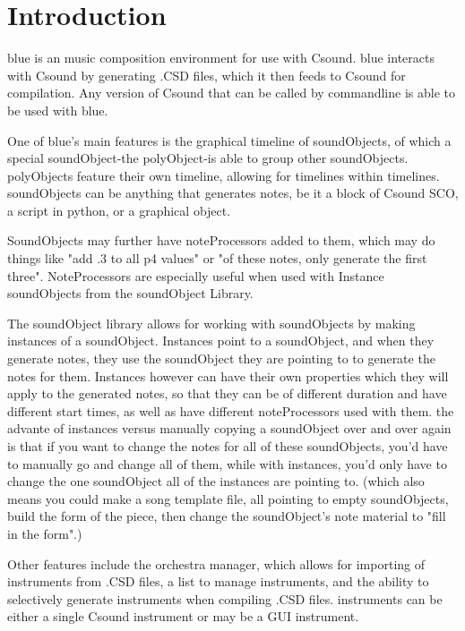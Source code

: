 \section{Introduction}\label{userIntro}

blue is an music composition environment for use with Csound. blue
interacts with Csound by generating .CSD files, which it then feeds to
Csound for compilation. Any version of Csound that can be called by
commandline is able to be used with blue.

One of blue's main features is the graphical timeline of soundObjects,
of which a special soundObject-the polyObject-is able to group other
soundObjects. polyObjects feature their own timeline, allowing for
timelines within timelines. soundObjects can be anything that generates
notes, be it a block of Csound SCO, a script in python, or a graphical
object.

SoundObjects may further have noteProcessors added to them, which may do
things like "add .3 to all p4 values" or "of these notes, only generate
the first three". NoteProcessors are especially useful when used with
Instance soundObjects from the soundObject Library.

The soundObject library allows for working with soundObjects by making
instances of a soundObject. Instances point to a soundObject, and when
they generate notes, they use the soundObject they are pointing to to
generate the notes for them. Instances however can have their own
properties which they will apply to the generated notes, so that they
can be of different duration and have different start times, as well as
have different noteProcessors used with them. the advante of instances
versus manually copying a soundObject over and over again is that if you
want to change the notes for all of these soundObjects, you'd have to
manually go and change all of them, while with instances, you'd only
have to change the one soundObject all of the instances are pointing to.
(which also means you could make a song template file, all pointing to
empty soundObjects, build the form of the piece, then change the
soundObject's note material to "fill in the form".)

Other features include the orchestra manager, which allows for importing
of instruments from .CSD files, a list to manage instruments, and the
ability to selectively generate instruments when compiling .CSD files.
instruments can be either a single Csound instrument or may be a GUI
instrument.
